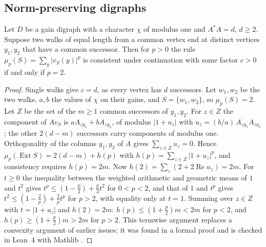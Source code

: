 \subsection{Norm-preserving digraphs}
\begin{theorem}\label{thm:power}
Let $D$ be a gain digraph with a character $\chi$ of modulus one and $A^*A=d$, $d\ge2$. Suppose two walks of equal length from a common vertex end at distinct vertices $y_1,y_2$ that have a common successor. Then for $p>0$ the rule $\mu_p(S)=\sum_y|v_S(y)|^p$ is consistent under continuation with some factor $c>0$ if and only if $p=2$.
\end{theorem}
\begin{proof}
Single walks give $c=d$, as every vertex has $d$ successors. Let $w_1,w_2$ be the two walks, $a,b$ the values of $\chi$ on their gains, and $S=\{w_1,w_2\}$, so $\mu_p(S)=2$. Let $Z$ be the set of the $m\ge1$ common successors of $y_1,y_2$. For $z\in Z$ the component of $Av_S$ is $aA_{zy_1}+bA_{zy_2}$, of modulus $|1+u_z|$ with $u_z=(b/a)\,\overline{A_{zy_1}}A_{zy_2}$; the other $2(d-m)$ successors carry components of modulus one. Orthogonality of the columns $y_1,y_2$ of $A$ gives $\sum_{z\in Z}u_z=0$. Hence $\mu_p(\operatorname{Ext}S)=2(d-m)+h(p)$ with $h(p)=\sum_{z\in Z}|1+u_z|^p$, and consistency requires $h(p)=2m$. Now $h(2)=\sum_z(2+2\operatorname{Re}u_z)=2m$. For $t\ge0$ the inequality between the weighted arithmetic and geometric means of $1$ and $t^2$ gives $t^p\le(1-\tfrac p2)+\tfrac p2t^2$ for $0<p<2$, and that of $1$ and $t^p$ gives $t^2\le(1-\tfrac2p)+\tfrac2pt^p$ for $p>2$, with equality only at $t=1$. Summing over $z\in Z$ with $t=|1+u_z|$ and $h(2)=2m$: $h(p)\le(1+\tfrac p2)m<2m$ for $p<2$, and $h(p)\ge(1+\tfrac p2)m>2m$ for $p>2$. This termwise argument replaces a convexity argument of earlier issues; it was found in a formal proof and is checked in Lean~4 with Mathlib \cite{comp4s}.
\end{proof}

